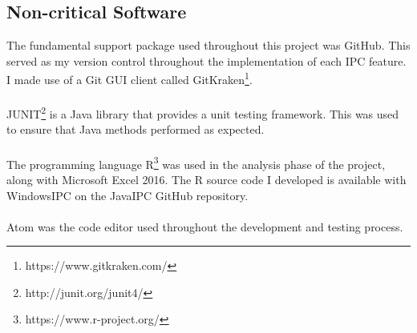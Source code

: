 \documentclass[12pt] {newrucsthesis}    %
\begin{document}
        \subsection{Non-critical Software}
          The fundamental support package used throughout this project was GitHub. This served
          as my version control throughout the implementation of each IPC feature. I made use
          of a Git GUI client called GitKraken\footnote{https://www.gitkraken.com/}.
          \\\\
          JUNIT\footnote{http://junit.org/junit4/} is a Java library that provides a unit testing framework. This
          was used to ensure that Java methods performed as expected.
          \\\\
          The programming language R\footnote{https://www.r-project.org/} was used in the analysis phase of the project, along with Microsoft Excel 2016.
          The R source code I developed is available with WindowsIPC on the JavaIPC GitHub repository.
          \\\\
          Atom was the code editor used throughout the development and testing process.
\end{document}
